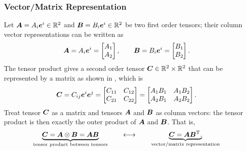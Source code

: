 \subsubsection{Vector/Matrix Representation}
Let $\bm{A}=A_i\bm{e}^i\in\mathbb{R}^2$ and $\bm{B}=B_i\bm{e}^i\in\mathbb{R}^2$ be two first order tensors; their column vector representations can be written as
\begin{gather}
\bm{A}=A_i\bm{e}^i=\begin{bmatrix}
A_1\\A_2
\end{bmatrix},\qquad
\bm{B}=B_i\bm{e}^i=\begin{bmatrix}
B_1\\B_2
\end{bmatrix}.
\end{gather}
The tensor product  gives a second order tensor $\bm{C}\in\mathbb{R}^2\times\mathbb{R}^2$ that can be represented by a matrix as shown in , which is
\begin{gather}
\bm{C}=C_{ij}\bm{e}^i\bm{e}^j=\begin{bmatrix}
C_{11}&C_{12}\\
C_{21}&C_{22}
\end{bmatrix}=\begin{bmatrix}
A_1B_1&A_1B_2\\
A_2B_1&A_2B_2
\end{bmatrix}.
\end{gather}
Treat tensor $\bm{C}$ as a matrix and tensors $\bm{A}$ and $\bm{B}$ as column vectors: the tensor product is then exactly the outer product of $\bm{A}$ and $\bm{B}$.
That is,
\begin{gather}\label{eq:tensor_product}
\underbrace{\bm{C}=\bm{A}\otimes\bm{B}=\bm{A}\bm{B}}_\text{tensor product between tensors}\qquad\longleftrightarrow\qquad\underbrace{\bm{C}=\bm{A}\bm{B}^{\mathrm{T}}.}_\text{{vector/matrix representation}}
\end{gather}

